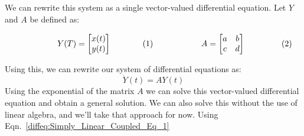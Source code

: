             \par\hfill\par
            We can rewrite this system as a single
            vector-valued differential equation.
            Let $Y$ and $A$ be defined as:
            \par\hfill\par
            \vspace{-1ex}
            \begin{subequations}
                \begin{minipage}{0.49\textwidth}
                    \begin{equation}
                        \label{diffeq:Vector_Rep_for_Coupled_Eq}
                        Y(T)=
                        \begin{bmatrix}
                            x(t)\\
                            y(t)
                        \end{bmatrix}
                    \end{equation}
                \end{minipage}
                \hfill
                \begin{minipage}{0.49\textwidth}
                    \begin{equation}
                        \label{diffeq:Coupled_Coefficient_Matrix}
                        A=
                        \begin{bmatrix}
                            a&b\\
                            c&d
                        \end{bmatrix}
                    \end{equation}
                \end{minipage}
            \end{subequations}
            \par\hfill\par
            Using this, we can rewrite our system of
            differential equations as:
            \begin{equation}
                \dot{Y}(t)=AY(t)
            \end{equation}
            Using the exponential of the matrix $A$
            we can solve this vector-valued differential
            equation and obtain a general solution.
            We can also solve this without the use of linear
            algebra, and we'll take that approach for now. Using
            Eqn.~\ref{diffeq:Simply_Linear_Coupled_Eq_1}
